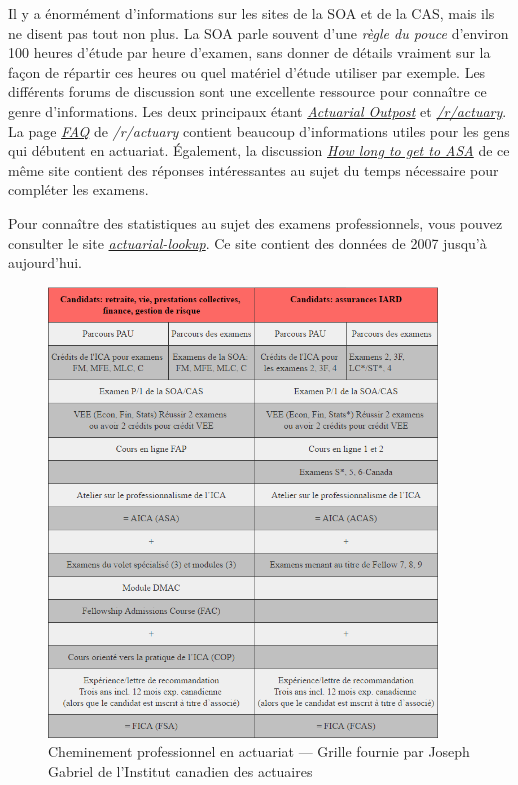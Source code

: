 Il y a énormément d'informations sur les sites de la SOA et de la CAS, mais ils ne disent pas tout non plus. La SOA parle souvent  d'une \emph{règle du pouce} d'environ 100 heures d'étude par heure d'examen, sans donner de détails vraiment sur la façon de répartir ces heures ou quel matériel d'étude utiliser par exemple. Les différents forums de discussion sont une excellente ressource pour connaître ce genre d'informations. Les deux principaux étant \href{http://www.actuarialoutpost.com/}{\emph{Actuarial Outpost}} et \href{https://www.reddit.com/r/actuary}{\emph{/r/actuary}}. La page \href{https://www.reddit.com/r/actuary/wiki/index#wiki_the_frequently_asked_questions_.28faqs.29}{\emph{FAQ}} de \emph{/r/actuary} contient beaucoup d'informations utiles pour les gens qui débutent en actuariat. Également, la discussion \href{https://www.reddit.com/r/actuary/comments/1enzdd/how_long_to_get_to_asa_is_two_years_possible/}{\emph{How long to get to ASA}} de ce même site contient des réponses intéressantes au sujet du temps nécessaire pour compléter les examens. \vspace{\baselineskip}

Pour connaître des statistiques au sujet des examens professionnels, vous pouvez consulter le site \href{http://actuarial-lookup.com/}{\emph{actuarial-lookup}}. Ce site contient des données de 2007 jusqu'à aujourd'hui.

\begin{center}
\begin{figure}[hp]
\includegraphics[width=0.92\textwidth]{tableau_ICA.png}
\caption{Cheminement professionnel en actuariat --- Grille fournie par Joseph Gabriel de l'Institut canadien des actuaires}
\end{figure}
\par
\end{center}

